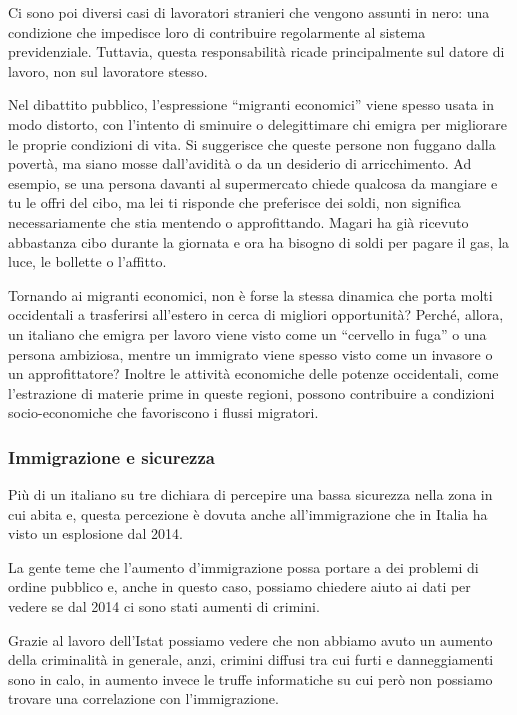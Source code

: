 \documentclass[12pt]{book} %
\begin{document}
Ci sono poi diversi casi di lavoratori stranieri che vengono assunti in nero: una condizione che impedisce loro di contribuire regolarmente al sistema previdenziale. Tuttavia, questa responsabilità ricade principalmente sul datore di lavoro, non sul lavoratore stesso.

Nel dibattito pubblico, l’espressione “migranti economici” viene spesso usata in modo distorto, con l’intento di sminuire o delegittimare chi emigra per migliorare le proprie condizioni di vita. Si suggerisce che queste persone non fuggano dalla povertà, ma siano mosse dall’avidità o da un desiderio di arricchimento.
Ad esempio, se una persona davanti al supermercato chiede qualcosa da mangiare e tu le offri del cibo, ma lei ti risponde che preferisce dei soldi, non significa necessariamente che stia mentendo o approfittando. Magari ha già ricevuto abbastanza cibo durante la giornata e ora ha bisogno di soldi per pagare il gas, la luce, le bollette o l’affitto.

Tornando ai migranti economici, non è forse la stessa dinamica che porta molti occidentali a trasferirsi all’estero in cerca di migliori opportunità? Perché, allora, un italiano che emigra per lavoro viene visto come un “cervello in fuga” o una persona ambiziosa, mentre un immigrato viene spesso visto come un invasore o un approfittatore? Inoltre le attività economiche delle potenze occidentali, come l’estrazione di materie prime in queste regioni, possono contribuire a condizioni socio-economiche che favoriscono i flussi migratori.

\subsubsection{Immigrazione e sicurezza}
Più di un italiano su tre dichiara di percepire una bassa sicurezza nella zona in cui abita e, questa percezione è dovuta anche
all'immigrazione che in Italia ha visto un esplosione dal
2014.

La gente teme che l'aumento d'immigrazione possa portare a dei problemi di
ordine pubblico e, anche in questo caso, possiamo chiedere aiuto ai dati per vedere se dal 2014 ci sono stati aumenti
di crimini.

Grazie al lavoro dell'Istat possiamo vedere
che non abbiamo avuto un aumento della criminalità in generale, anzi, crimini diffusi tra cui furti e danneggiamenti
sono in calo, in aumento invece le truffe informatiche su cui però non possiamo trovare una correlazione con
l'immigrazione.
\end{document}
